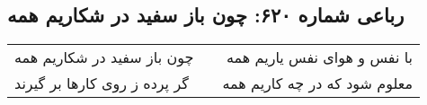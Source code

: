 \begin{center}
\section*{رباعی شماره ۶۲۰: چون باز سفید در شکاریم همه}
\label{sec:sh620}
\begin{longtable}{l p{0.5cm} r}
چون باز سفید در شکاریم همه
&&
با نفس و هوای نفس یاریم همه
\\
گر پرده ز روی کارها بر گیرند
&&
معلوم شود که در چه کاریم همه
\\
\end{longtable}
\end{center}
